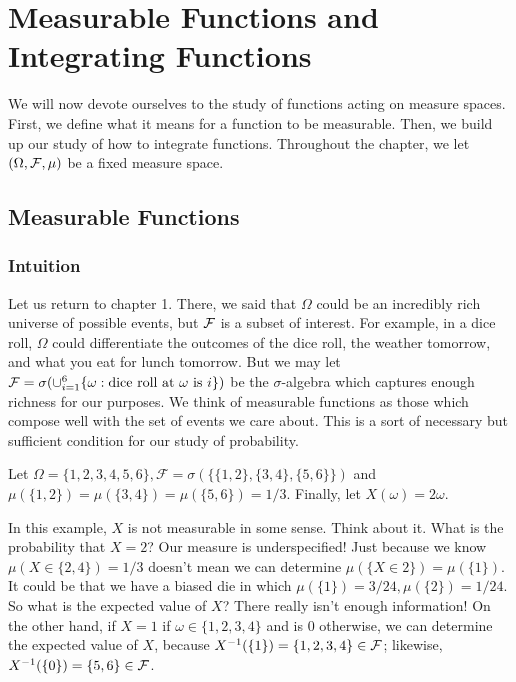 
\chapter{Measurable Functions and Integrating Functions}

We will now devote ourselves to the study of functions acting on measure spaces. 
First, we define what it means for a function to be measurable. Then, we build up 
our study of how to integrate functions. Throughout the chapter, we let 
$(\Omega, \mathcal F, \mu)$ be a fixed measure space.

\section{Measurable Functions}

\subsection{Intuition}

Let us return to chapter 1. There, we said that $\Omega$ could be an incredibly rich 
universe of possible events, but $\mathcal F$ is a subset of interest. For example, in a dice roll,
$\Omega$ could differentiate the outcomes of the dice roll, the weather tomorrow, and 
what you eat for lunch tomorrow. But we may let $\mathcal F = \sigma(\cup_{i=1}^6\{ \omega : \text{dice roll at $\omega$ is $i$}\})$ 
be the $\sigma$-algebra which captures enough richness for our purposes. We think of measurable 
functions as those which compose well with the set of events we care about. This is a sort of necessary 
but sufficient condition for our study of probability.

\begin{example}
    Let $\Omega = \{1,2,3,4,5,6\}, \mathcal F = \sigma(\{\{1,2\},\{3,4\}, \{5,6\}\})$ and 
    $\mu(\{1,2\}) = \mu(\{3,4\}) = \mu(\{5,6\}) = 1/3$. Finally, let $X(\omega) = 2\omega$.
\end{example}

In this example, $X$ is not measurable in some sense. Think about it. What is the probability that 
$X = 2$? Our measure is underspecified! Just because we know $\mu(X \in \{2,4\}) = 1/3$ doesn't mean we can 
determine $\mu(\{X \in 2\}) = \mu(\{1\})$. It could be that we have a biased die in which
$\mu(\{1\}) = 3/24, \mu(\{2\}) = 1/24$. So what is the expected value of $X$? There really isn't 
enough information! On the other hand, if $X = 1$ if $\omega \in \{1,2,3,4\}$ and is $0$ otherwise, 
we can determine the expected value of $X$, because $X^{-1}(\{1\}) = \{1,2,3,4\} \in \mathcal F$; likewise, 
$X^{-1}(\{0\}) = \{5,6\} \in \mathcal F$. 

